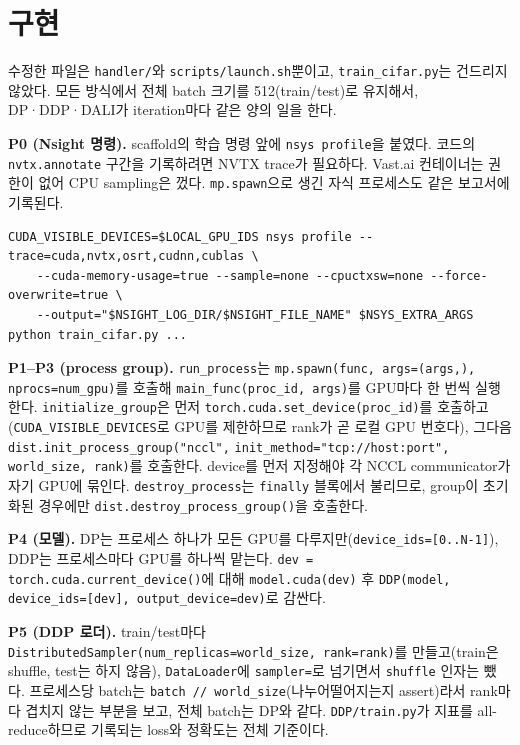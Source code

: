 \documentclass[11pt,a4paper]{article}
\begin{document}
\sloppy
\maketitleblock

\section{구현}

수정한 파일은 \texttt{handler/}와 \texttt{scripts/launch.sh}뿐이고, \texttt{train\_cifar.py}는 건드리지 않았다.
모든 방식에서 전체 batch 크기를 512(train/test)로 유지해서, DP·DDP·DALI가 iteration마다 같은 양의 일을 한다.

\textbf{P0 (Nsight 명령).} scaffold의 학습 명령 앞에 \texttt{nsys profile}을 붙였다. 코드의 \texttt{nvtx.annotate} 구간을 기록하려면
NVTX trace가 필요하다. Vast.ai 컨테이너는 권한이 없어 CPU sampling은 껐다. \texttt{mp.spawn}으로 생긴 자식 프로세스도 같은 보고서에 기록된다.
\begin{lstlisting}
CUDA_VISIBLE_DEVICES=$LOCAL_GPU_IDS nsys profile --trace=cuda,nvtx,osrt,cudnn,cublas \
    --cuda-memory-usage=true --sample=none --cpuctxsw=none --force-overwrite=true \
    --output="$NSIGHT_LOG_DIR/$NSIGHT_FILE_NAME" $NSYS_EXTRA_ARGS python train_cifar.py ...
\end{lstlisting}

\textbf{P1--P3 (process group).} \texttt{run\_process}는 \texttt{mp.spawn(func, args=(args,), nprocs=num\_gpu)}를 호출해
\texttt{main\_func(proc\_id, args)}를 GPU마다 한 번씩 실행한다. \texttt{initialize\_group}은 먼저 \texttt{torch.cuda.set\_device(proc\_id)}를 호출하고
(\texttt{CUDA\_VISIBLE\_DEVICES}로 GPU를 제한하므로 rank가 곧 로컬 GPU 번호다), 그다음
\texttt{dist.init\_process\_group("nccl",} \mbox{\texttt{init\_method="tcp://host:port",}} \texttt{world\_size, rank)}를 호출한다. device를 먼저 지정해야 각 NCCL
communicator가 자기 GPU에 묶인다. \texttt{destroy\_process}는 \texttt{finally} 블록에서 불리므로, group이 초기화된 경우에만
\texttt{dist.destroy\_process\_group()}을 호출한다.

\textbf{P4 (모델).} DP는 프로세스 하나가 모든 GPU를 다루지만(\texttt{device\_ids=[0..N-1]}), DDP는 프로세스마다 GPU를 하나씩 맡는다.
\texttt{dev = torch.cuda.current\_device()}에 대해 \texttt{model.cuda(dev)} 후 \texttt{DDP(model, device\_ids=[dev], output\_device=dev)}로 감싼다.

\textbf{P5 (DDP 로더).} train/test마다 \texttt{DistributedSampler(num\_replicas=world\_size, rank=rank)}를 만들고(train은 shuffle, test는 하지 않음),
\texttt{DataLoader}에 \texttt{sampler=}로 넘기면서 \texttt{shuffle} 인자는 뺐다. 프로세스당 batch는 \texttt{batch // world\_size}(나누어떨어지는지 assert)라서
rank마다 겹치지 않는 부분을 보고, 전체 batch는 DP와 같다. \texttt{DDP/train.py}가 지표를 all-reduce하므로 기록되는 loss와 정확도는 전체 기준이다.
\end{document}
